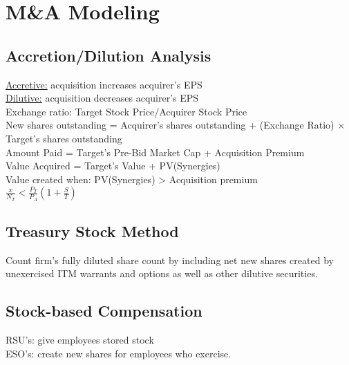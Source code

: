 \section{M\&A Modeling}
	\subsection*{Accretion/Dilution Analysis}
	\underline{Accretive:} acquisition increases acquirer's EPS\\
	\underline{Dilutive:} acquisition decreases acquirer's EPS\\
	Exchange ratio: Target Stock Price/Acquirer Stock Price\\
	New shares outstanding = Acquirer's shares outstanding + (Exchange Ratio) $\times$ Target's shares outstanding\\
	Amount Paid = Target's Pre-Bid Market Cap + Acquisition Premium\\
	Value Acquired = Target's Value + PV(Synergies)\\
	Value created when: PV(Synergies) > Acquisition premium\\
	$\frac{x}{N_{T}} < \frac{P_{T}}{P_{A}}\left(1 + \frac{S}{T}\right)$
	
	\subsection*{Treasury Stock Method}
	Count firm's fully diluted share count by including net new shares created by unexercised ITM warrants and options as well as other dilutive securities.
	
	\subsection*{Stock-based Compensation}
	RSU's: give employees stored stock\\
	ESO's: create new shares for employees who exercise.
